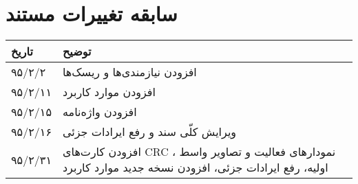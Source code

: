 
\chapter{سابقه تغییرات مستند}

\begin{table}[H]
	\centering
	\begin{tabular}{|p{3cm}|p{5cm}|}
		\hline
		تاریخ & توضیح \\
		\hline
		
		۹۵/۲/۲  & افزودن نیازمندی‌ها و ریسک‌ها \\
		۹۵/۲/۱۱  & افزودن موارد کاربرد \\
		۹۵/۲/۱۵  & افزودن واژه‌نامه \\
		۹۵/۲/۱۶  & ویرایش کلّی سند و رفع ایرادات جزئی \\
		۹۵/۲/۳۱  & افزودن کارت‌های CRC ، نمودارهای فعالیت و تصاویر واسط اولیه، رفع ایرادات جزئی، افزودن نسخه جدید موارد کاربرد \\
		
		
		\hline
	\end{tabular}
\end{table}
